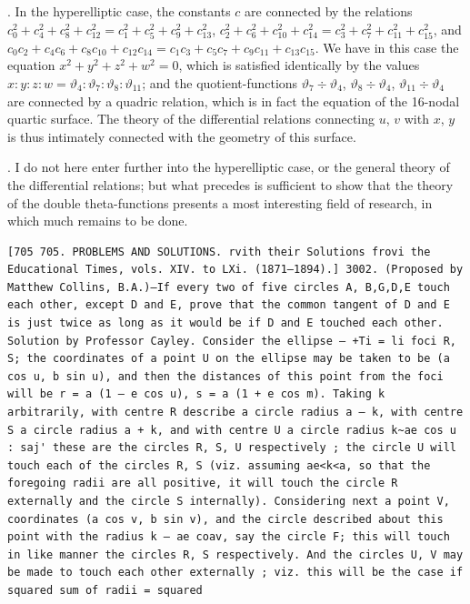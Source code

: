 \documentclass[11pt,a4paper]{book}
\begin{document}
. In the hyperelliptic case, the constants $c$ are connected by the relations $c_0^2 + c_4^2 + c_8^2 + c_{12}^2 = c_1^2 + c_5^2 + c_9^2 + c_{13}^2$, $c_2^2 + c_6^2 + c_{10}^2 + c_{14}^2 = c_3^2 + c_7^2 + c_{11}^2 + c_{15}^2$, and $c_0 c_2 + c_4 c_6 + c_8 c_{10} + c_{12} c_{14} = c_1 c_3 + c_5 c_7 + c_9 c_{11} + c_{13} c_{15}$. We have in this case the equation $x^2 + y^2 + z^2 + w^2 = 0$, which is satisfied identically by the values $x : y : z : w = \vartheta_4 : \vartheta_7 : \vartheta_8 : \vartheta_{11}$; and the quotient-functions $\vartheta_7 \div \vartheta_4$, $\vartheta_8 \div \vartheta_4$, $\vartheta_{11} \div \vartheta_4$ are connected by a quadric relation, which is in fact the equation of the 16-nodal quartic surface. The theory of the differential relations connecting $u$, $v$ with $x$, $y$ is thus intimately connected with the geometry of this surface.

\newpage
\setcounter{page}{565}

. I do not here enter further into the hyperelliptic case, or the general theory of the differential relations; but what precedes is sufficient to show that the theory of the double theta-functions presents a most interesting field of research, in which much remains to be done.

\bigskip






\newpage
\setcounter{page}{566}
\begin{verbatim}
[705 705. PROBLEMS AND SOLUTIONS. rvith their Solutions frovi the Educational Times, vols. XIV. to LXi. (1871—1894).] 3002. (Proposed by Matthew Collins, B.A.)—If every two of five circles A, B,G,D,E touch each other, except D and E, prove that the common tangent of D and E is just twice as long as it would be if D and E touched each other. Solution by Professor Cayley. Consider the ellipse — +Ti = li foci R, S; the coordinates of a point U on the ellipse may be taken to be (a cos u, b sin u), and then the distances of this point from the foci will be r = a (1 — e cos u), s = a (1 + e cos m). Taking k arbitrarily, with centre R describe a circle radius a — k, with centre S a circle radius a + k, and with centre U a circle radius k~ae cos u : saj' these are the circles R, S, U respectively ; the circle U will touch each of the circles R, S (viz. assuming ae<k<a, so that the foregoing radii are all positive, it will touch the circle R externally and the circle S internally). Considering next a point V, coordinates (a cos v, b sin v), and the circle described about this point with the radius k — ae coav, say the circle F; this will touch in like manner the circles R, S respectively. And the circles U, V may be made to touch each other externally ; viz. this will be the case if squared sum of radii = squared 
\end{verbatim}
\end{document}
